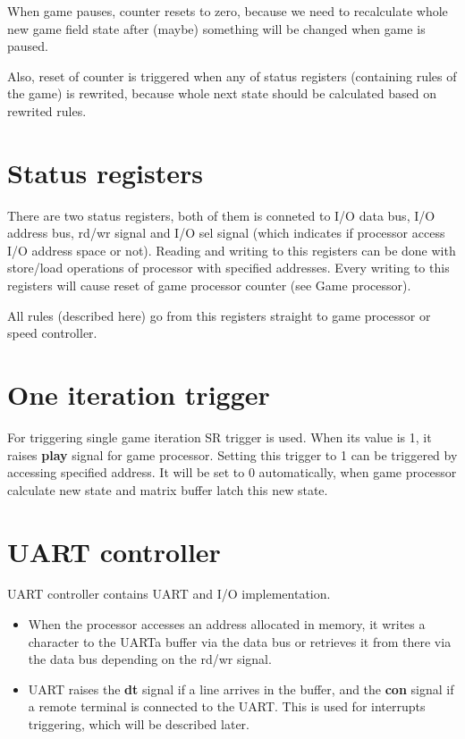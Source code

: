 When game pauses, counter resets to zero, because we need to recalculate whole new game field state after (maybe) something will be changed when game is paused. 

Also, reset of counter is triggered when any of status registers (containing rules of the game) is rewrited, because whole next state should be calculated based on rewrited rules.

\section*{Status registers}

There are two status registers, both of them is conneted to I/O data bus, I/O address bus, rd/wr signal and I/O sel signal (which indicates if processor access I/O address space or not). Reading and writing to this registers can be done with store/load operations of processor with specified addresses. Every writing to this registers will cause reset of game processor counter (see Game processor).

All rules (described here) go from this registers straight to game processor or speed controller.

\section*{One iteration trigger}

For triggering single game iteration SR trigger is used. When its value is 1, it raises \textbf{play} signal for game processor. Setting this trigger to 1 can be triggered by accessing specified address. It will be set to 0 automatically, when game processor calculate new state and matrix buffer latch this new state.

\section*{UART controller}

UART controller contains UART and I/O implementation.

\begin{itemize}
	\item When the processor accesses an address allocated in memory, it writes a character to the UARTa buffer via the data bus or retrieves it from there via the data bus depending on the rd/wr signal.
	\item UART raises the \textbf{dt} signal if a line arrives in the buffer, and the \textbf{con} signal if a remote terminal is connected to the UART. This is used for interrupts triggering, which will be described later.
\end{itemize}

